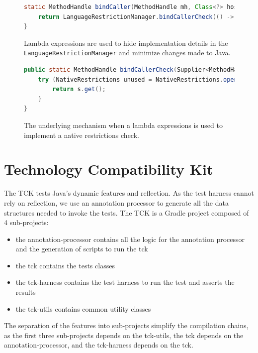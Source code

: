 \begin{figure}[ht]
    \centering
\begin{lstlisting}[language=Java]
static MethodHandle bindCaller(MethodHandle mh, Class<?> hostClass) {
    return LanguageRestrictionManager.bindCallerCheck(() -> BindCaller.bindCaller(mh, hostClass));
}
\end{lstlisting}
    \caption{Lambda expressions are used to hide implementation details in the \texttt{LanguageRestrictionManager} and minimize changes made to Java.}
    \label{fig:bind_caller_lambda}
\end{figure}

\begin{figure}[ht]
    \centering
\begin{lstlisting}[language=Java]
public static MethodHandle bindCallerCheck(Supplier<MethodHandle> s) {
    try (NativeRestrictions unused = NativeRestrictions.openScope()) {
        return s.get();
    }
}
\end{lstlisting}
    \caption{The underlying mechanism when a lambda expressions is used to implement a native restrictions check.}
    \label{fig:bind_caller_lrm}
\end{figure}

\section{Technology Compatibility Kit}\label{TCK}
The TCK tests Java's dynamic features and reflection. As the test harness cannot rely on reflection, we use an annotation processor to generate all the data structures needed to invoke the tests. 
The TCK is a Gradle project composed of 4 sub-projects: 
\begin{itemize}
    \item the annotation-processor contains all the logic for the annotation processor and the generation of scripts to run the tck
    \item the tck contains the tests classes
    \item the tck-harness contains the test harness to run the test and asserts the results
    \item the tck-utils contains common utility classes
\end{itemize}
The separation of the features into sub-projects simplify the compilation chains, as the first three sub-projects depends on the tck-utils, the tck depends on the annotation-processor, and the tck-harness depends on the tck.

